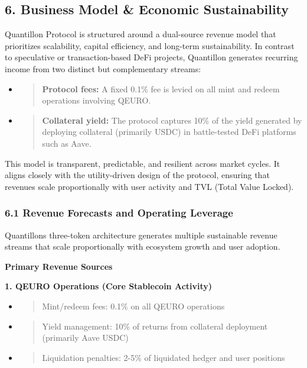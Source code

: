 \hypertarget{business-model-economic-sustainability}{%
\subsection{6. Business Model \& Economic
Sustainability}\label{business-model-economic-sustainability}}

Quantillon Protocol is structured around a dual-source revenue model
that prioritizes scalability, capital efficiency, and long-term
sustainability. In contrast to speculative or transaction-based DeFi
projects, Quantillon generates recurring income from two distinct but
complementary streams:

\begin{itemize}
\item
  \begin{quote}
  \textbf{Protocol fees:} A fixed 0.1\% fee is levied on all mint and
  redeem operations involving QEURO.
  \end{quote}
\item
  \begin{quote}
  \textbf{Collateral yield:} The protocol captures 10\% of the yield
  generated by deploying collateral (primarily USDC) in battle-tested
  DeFi platforms such as Aave.
  \end{quote}
\end{itemize}

This model is transparent, predictable, and resilient across market
cycles. It aligns closely with the utility-driven design of the
protocol, ensuring that revenues scale proportionally with user activity
and TVL (Total Value Locked).

\hypertarget{revenue-forecasts-and-operating-leverage}{%
\subsubsection{6.1 Revenue Forecasts and Operating
Leverage}\label{revenue-forecasts-and-operating-leverage}}

Quantillon\textquotesingle s three-token architecture generates multiple
sustainable revenue streams that scale proportionally with ecosystem
growth and user adoption.

\textbf{Primary Revenue Sources}

\textbf{1. QEURO Operations (Core Stablecoin Activity)}

\begin{itemize}
\item
  \begin{quote}
  Mint/redeem fees: 0.1\% on all QEURO operations
  \end{quote}
\item
  \begin{quote}
  Yield management: 10\% of returns from collateral deployment
  (primarily Aave USDC)
  \end{quote}
\item
  \begin{quote}
  Liquidation penalties: 2-5\% of liquidated hedger and user positions
  \end{quote}
\end{itemize}

